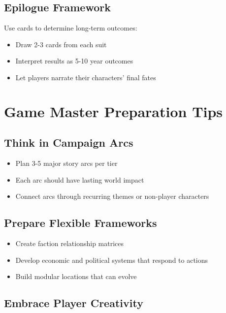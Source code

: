 \subsection*{Epilogue Framework}

Use cards to determine long-term outcomes:
\begin{itemize}
    \item Draw 2-3 cards from each suit
    \item Interpret results as 5-10 year outcomes
    \item Let players narrate their characters' final fates
\end{itemize}

\section{Game Master Preparation Tips}

\subsection*{Think in Campaign Arcs}

\begin{itemize}
    \item Plan 3-5 major story arcs per tier
    \item Each arc should have lasting world impact
    \item Connect arcs through recurring themes or non-player characters
\end{itemize}

\subsection*{Prepare Flexible Frameworks}

\begin{itemize}
    \item Create faction relationship matrices
    \item Develop economic and political systems that respond to actions
    \item Build modular locations that can evolve
\end{itemize}

\subsection*{Embrace Player Creativity}

